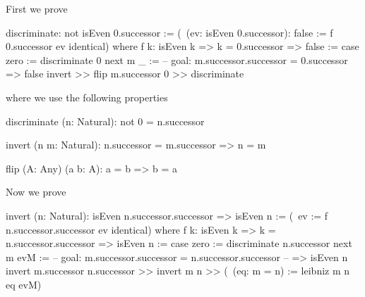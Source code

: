 \noindent First we prove 
%
\begin{alba}
    discriminate: not isEven 0.successor
    :=
        (\ (ev: isEven 0.successor): false :=
            f 0.successor ev identical)
        where
            f k: isEven k => k = 0.successor => false
            :=
                case
                    zero :=
                        discriminate 0
                    next m _ :=
                        -- goal: m.successor.successor = 0.successor => false
                        invert >> flip m.successor 0 >> discriminate
\end{alba}
%
where we use the following properties
%
\begin{alba}
    discriminate (n: Natural): not 0 = n.successor

    invert (n m: Natural): n.successor = m.successor => n = m

    flip (A: Any) (a b: A): a = b => b = a
\end{alba}




\noindent Now we prove 
%
\begin{alba}
    invert (n: Natural): isEven n.successor.successor => isEven n
    :=
        (\ ev := f n.successor.successor ev identical)
        where
        f k: isEven k => k = n.successor.successor => isEven n
        :=
            case
                zero :=
                    discriminate n.successor
                next m evM :=
                    -- goal: m.successor.successor = n.successor.successor
                    --       => isEven n
                    invert m.successor n.successor
                    >> invert m n
                    >> (\ (eq: m = n) := leibniz m n eq evM)
\end{alba}







